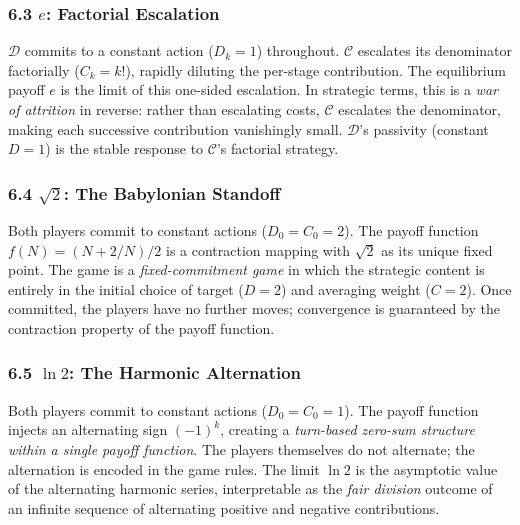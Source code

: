 \documentclass[12pt]{article}
\begin{document}
\subsubsection{\texorpdfstring{6.3 \(e\): Factorial
Escalation}{6.3 e: Factorial Escalation}}\label{e-factorial-escalation}

\(\mathcal{D}\) commits to a constant action (\(D_k = 1\)) throughout.
\(\mathcal{C}\) escalates its denominator factorially (\(C_k = k!\)),
rapidly diluting the per-stage contribution. The equilibrium payoff
\(e\) is the limit of this one-sided escalation. In strategic terms,
this is a \emph{war of attrition} in reverse: rather than escalating
costs, \(\mathcal{C}\) escalates the denominator, making each successive
contribution vanishingly small. \(\mathcal{D}\)'s passivity (constant
\(D = 1\)) is the stable response to \(\mathcal{C}\)'s factorial
strategy.

\subsubsection{\texorpdfstring{6.4 \(\sqrt{2}\): The Babylonian
Standoff}{6.4 \textbackslash sqrt\{2\}: The Babylonian Standoff}}\label{sqrt2-the-babylonian-standoff}

Both players commit to constant actions (\(D_0 = C_0 = 2\)). The payoff
function \(f(N) = (N + 2/N)/2\) is a contraction mapping with
\(\sqrt{2}\) as its unique fixed point. The game is a
\emph{fixed-commitment game} in which the strategic content is entirely
in the initial choice of target (\(D = 2\)) and averaging weight
(\(C = 2\)). Once committed, the players have no further moves;
convergence is guaranteed by the contraction property of the payoff
function.

\subsubsection{\texorpdfstring{6.5 \(\ln 2\): The Harmonic
Alternation}{6.5 \textbackslash ln 2: The Harmonic Alternation}}\label{ln-2-the-harmonic-alternation}

Both players commit to constant actions (\(D_0 = C_0 = 1\)). The payoff
function injects an alternating sign \((-1)^k\), creating a
\emph{turn-based zero-sum structure within a single payoff function}.
The players themselves do not alternate; the alternation is encoded in
the game rules. The limit \(\ln 2\) is the asymptotic value of the
alternating harmonic series, interpretable as the \emph{fair division}
outcome of an infinite sequence of alternating positive and negative
contributions.
\end{document}
